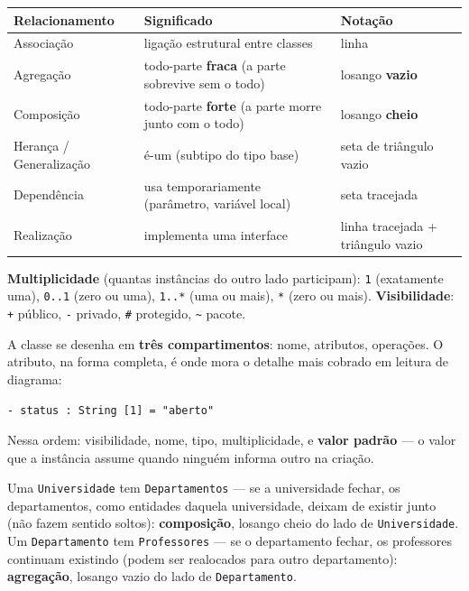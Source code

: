 \begin{conceito}
\begin{center}
\begin{tabular}{@{}p{3.6cm}p{4.6cm}p{2.6cm}@{}}
\toprule
\textbf{Relacionamento} & \textbf{Significado} & \textbf{Notação} \\
\midrule
Associação & ligação estrutural entre classes & linha \\
Agregação & todo-parte \textbf{fraca} (a parte sobrevive sem o todo) &
losango \textbf{vazio} \\
Composição & todo-parte \textbf{forte} (a parte morre junto com o todo) &
losango \textbf{cheio} \\
Herança / Generalização & é-um (subtipo do tipo base) & seta de triângulo
vazio \\
Dependência & usa temporariamente (parâmetro, variável local) & seta
tracejada \\
Realização & implementa uma interface & linha tracejada + triângulo vazio \\
\bottomrule
\end{tabular}
\end{center}

\textbf{Multiplicidade} (quantas instâncias do outro lado participam):
\texttt{1} (exatamente uma), \texttt{0..1} (zero ou uma), \texttt{1..*}
(uma ou mais), \texttt{*} (zero ou mais). \textbf{Visibilidade}:
\texttt{+} público, \texttt{-} privado, \texttt{\#} protegido,
\texttt{\textasciitilde} pacote.

A classe se desenha em \textbf{três compartimentos}: nome, atributos,
operações. O atributo, na forma completa, é onde mora o detalhe mais
cobrado em leitura de diagrama:

\begin{center}
\texttt{- status : String [1] = "aberto"}
\end{center}

Nessa ordem: visibilidade, nome, tipo, multiplicidade, e \textbf{valor
padrão} --- o valor que a instância assume quando ninguém informa outro na
criação.
\end{conceito}

\begin{exemplo}
Uma \texttt{Universidade} tem \texttt{Departamentos} --- se a universidade
fechar, os departamentos, como entidades daquela universidade, deixam de
existir junto (não fazem sentido soltos): \textbf{composição}, losango
cheio do lado de \texttt{Universidade}. Um \texttt{Departamento} tem
\texttt{Professores} --- se o departamento fechar, os professores continuam
existindo (podem ser realocados para outro departamento):
\textbf{agregação}, losango vazio do lado de \texttt{Departamento}.
\end{exemplo}

